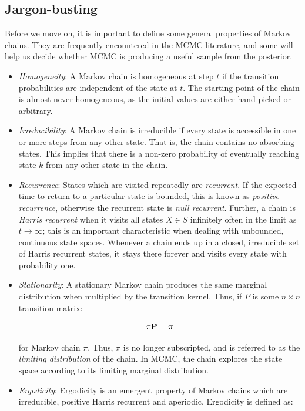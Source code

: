 \documentclass[]{book}
\begin{document}
\subsection{Jargon-busting}

Before we move on, it is important to define some general properties of Markov chains. They are frequently encountered in the MCMC literature, and some will help us decide whether MCMC is producing a useful sample from the posterior.

\begin{itemize}
\item \emph{Homogeneity}: A Markov chain is homogeneous at step $t$ if the transition probabilities are independent of the state at $t$. The starting point of the chain is almost never homogeneous, as the initial values are either hand-picked or arbitrary.
\item \emph{Irreducibility}: A Markov chain is irreducible if every state is accessible in one or more steps from any other state. That is, the chain contains no absorbing states. This implies that there is a non-zero probability of eventually reaching state $k$ from any other state in the chain. 
\item \emph{Recurrence}: States which are visited repeatedly are \emph{recurrent}. If the expected time to return to a particular state is bounded, this is known as \emph{positive recurrence}, otherwise the recurrent state is \emph{null recurrent}. Further, a chain is \emph{Harris recurrent} when it visits all states $X \in S$ infinitely often in the limit as $t \to \infty$; this is an important characteristic when dealing with unbounded, continuous state spaces. Whenever a chain ends up in a closed, irreducible set of Harris recurrent states, it stays there forever and visits every state with probability one.
\item \emph{Stationarity}: A stationary Markov chain produces the same marginal distribution when multiplied by the transition kernel.  Thus, if $P$ is some $n \times n$ transition matrix:

\[{\bf \pi P} = {\bf \pi}\]

\noindent for Markov chain $\pi$. Thus, $\pi$ is no longer subscripted, and is referred to as the \emph{limiting distribution} of the chain. In MCMC, the chain explores the state space according to its limiting marginal distribution.
\item \emph{Ergodicity}: Ergodicity is an emergent property of Markov chains which are irreducible, positive Harris recurrent and aperiodic. Ergodicity is defined as:


\end{itemize}
\end{document}
